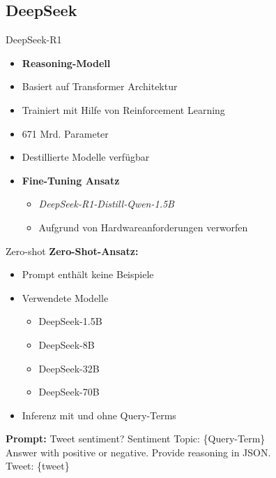 \documentclass[aspectratio=169]{beamer} %
\begin{document}

\subsection{DeepSeek}

\begin{frame}{DeepSeek-R1}
\begin{itemize}
\item \textbf{Reasoning-Modell}
\item Basiert auf Transformer Architektur
\item Trainiert mit Hilfe von Reinforcement Learning
\item 671 Mrd. Parameter
\item Destillierte Modelle verfügbar
\end{itemize}
\vspace{0.4cm}

\begin{itemize}
    \item \textbf{Fine-Tuning Ansatz}
    \begin{itemize}
        \item \textit{DeepSeek-R1-Distill-Qwen-1.5B}
        \item Aufgrund von Hardwareanforderungen verworfen
\end{itemize}
\end{itemize}
\end{frame}

\begin{frame}{Zero-shot}
  \textbf{Zero-Shot-Ansatz:}

  \vspace{0.35cm}

  \begin{itemize}
      \item Prompt enthält keine Beispiele
      \item Verwendete Modelle
      \begin{itemize}
          \item DeepSeek-1.5B
          \item DeepSeek-8B
          \item DeepSeek-32B
          \item DeepSeek-70B 
      \end{itemize}
      \item Inferenz mit und ohne Query-Terms
  \end{itemize}
  \vspace{0.2cm}
  \centering
  \textbf{Prompt:} Tweet sentiment? Sentiment Topic: \{Query-Term\} \\ 
  Answer with positive or negative. Provide reasoning in JSON.\\
    Tweet: \glqq\{tweet\}\grqq
\end{frame}
\end{document}

